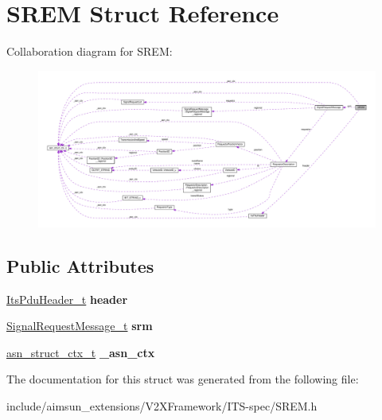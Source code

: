 \hypertarget{structSREM}{}\section{S\+R\+EM Struct Reference}
\label{structSREM}


Collaboration diagram for S\+R\+EM\+:\nopagebreak
\begin{figure}[H]
\begin{center}
\leavevmode
\includegraphics[width=350pt]{structSREM__coll__graph}
\end{center}
\end{figure}
\subsection*{Public Attributes}
\begin{DoxyCompactItemize}
\item 
\hyperlink{structItsPduHeader}{Its\+Pdu\+Header\+\_\+t} {\bfseries header}\hypertarget{structSREM_ac252a8ce49401984d6516c7a3aa49d47}{}\label{structSREM_ac252a8ce49401984d6516c7a3aa49d47}

\item 
\hyperlink{structSignalRequestMessage}{Signal\+Request\+Message\+\_\+t} {\bfseries srm}\hypertarget{structSREM_a8362ebcef051acb3175ace53f775fbed}{}\label{structSREM_a8362ebcef051acb3175ace53f775fbed}

\item 
\hyperlink{structasn__struct__ctx__s}{asn\+\_\+struct\+\_\+ctx\+\_\+t} {\bfseries \+\_\+asn\+\_\+ctx}\hypertarget{structSREM_a2b3a5721038af0de18976b63c346f8f0}{}\label{structSREM_a2b3a5721038af0de18976b63c346f8f0}

\end{DoxyCompactItemize}


The documentation for this struct was generated from the following file\+:\begin{DoxyCompactItemize}
\item 
include/aimsun\+\_\+extensions/\+V2\+X\+Framework/\+I\+T\+S-\/spec/S\+R\+E\+M.\+h\end{DoxyCompactItemize}
